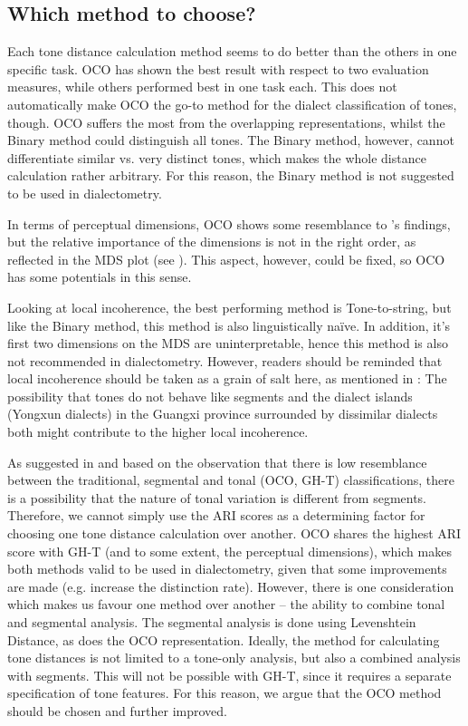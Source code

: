 \documentclass[output=paper, chinesefont]{langscibook}
\begin{document}
\subsection{Which method to choose?}\label{sec:sung:6.2}

Each tone distance calculation method seems to do better than the others in one specific task.  OCO has shown the best result with respect to two evaluation measures, while others performed best in one task each. This does not automatically make OCO the go-to method for the dialect classification of tones, though. OCO suffers the most from the overlapping representations, whilst the Binary method could distinguish all tones. The Binary method, however, cannot differentiate similar vs. very distinct tones, which makes the whole distance calculation rather arbitrary. For this reason, the Binary method is not suggested to be used in dialectometry.

In terms of perceptual dimensions, OCO shows some resemblance to 's findings, but the relative importance of the dimensions is not in the right order, as reflected in the MDS plot (see ). This aspect, however, could be fixed, so OCO has some potentials in this sense. 

Looking at local incoherence, the best performing method is Tone-to-string, but like the Binary method, this method is also linguistically naïve. In addition, it’s first two dimensions on the MDS are uninterpretable, hence this method is also not recommended in dialectometry. However, readers should be reminded that local incoherence should be taken as a grain of salt here, as mentioned in : The possibility that tones do not behave like segments and the dialect islands (Yongxun dialects) in the Guangxi province surrounded by dissimilar dialects both might contribute to the higher local incoherence. 

As suggested in  and based on the observation that there is low resemblance between the traditional, segmental and tonal (OCO, GH-T) classifications, there is a possibility that the nature of tonal variation is different from segments. Therefore, we cannot simply use the ARI scores as a determining factor for choosing one tone distance calculation over another. OCO shares the highest ARI score with GH-T (and to some extent, the perceptual dimensions), which makes both methods valid to be used in dialectometry, given that some improvements are made (e.g. increase the distinction rate). However, there is one consideration which makes us favour one method over another – the ability to combine tonal and segmental analysis. The segmental analysis is done using Levenshtein Distance, as does the OCO representation. Ideally, the method for calculating tone distances is not limited to a tone-only analysis, but also a combined analysis with segments. This will not be possible with GH-T, since it requires a separate specification of tone features. For this reason, we argue that the OCO method should be chosen and further improved.
\end{document}
